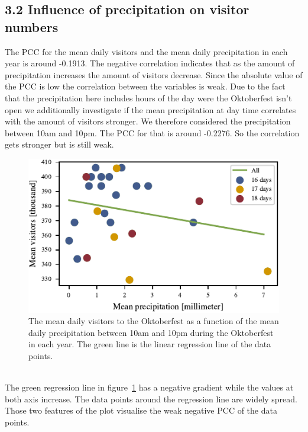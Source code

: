 \documentclass{article}
\theoremstyle{plain}
\theoremstyle{definition}
\theoremstyle{remark}
\begin{document}
\subsection*{3.2 Influence of precipitation on visitor numbers}
The PCC for the mean daily visitors and the mean daily precipitation in each year is around -0.1913. The negative correlation indicates that as the amount of precipitation increases the amount of visitors decrease. Since the absolute value of the PCC is low the correlation between the variables is weak. Due to the fact that the precipitation here includes hours of the day were the Oktoberfest isn't open we additionally investigate if the mean precipitation at day time correlates with the amount of visitors stronger. We therefore considered the precipitation between 10am and 10pm. The PCC for that is around -0.2276. So the correlation gets stronger but is still weak.
\begin{figure}[ht]%
  \includegraphics{fig/totalprecipitation.pdf}
  \caption{The mean daily visitors to the Oktoberfest as a function of the mean daily precipitation between 10am and 10pm during the Oktoberfest in each year. The green line is the linear regression line of the data points.}
  \label{figure_precipitation}
\end{figure}\\
\noindent
The green regression line in figure~\ref{figure_precipitation} has a negative gradient while the values at both axis increase. The data points around the regression line are widely spread. Those two features of the plot visualise the weak negative PCC of the data points.\\
\end{document}
